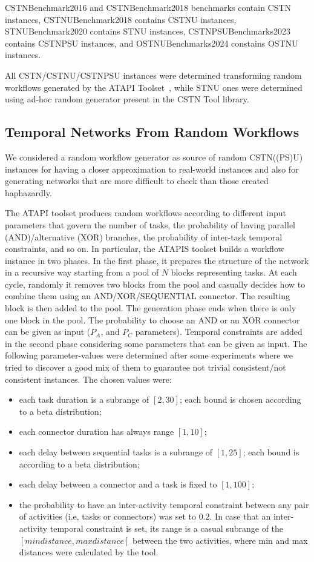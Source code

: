 \documentclass[a4paper,11pt]{article}
\begin{document}
CSTNBenchmark2016 and CSTNBenchmark2018 benchmarks contain CSTN instances, CSTNUBenchmark2018 contains CSTNU instances, STNUBenchmark2020 contains STNU instances, CSTNPSUBenchmarks2023 contains CSTNPSU instances, and OSTNUBenchmarks2024 constains 
OSTNU instances.

All CSTN/CSTNU/CSTNPSU instances were determined transforming random workflows generated by the ATAPI Toolset~\cite{LanzR14}, while STNU ones were determined using ad-hoc random generator present in the CSTN Tool library.


\subsection{Temporal Networks From Random Workflows}
We considered a random workflow generator as source of random CSTN((PS)U) instances for having a closer approximation to real-world instances and also for generating networks that are more difficult to check than those created haphazardly.

The ATAPI toolset produces random workflows according to different input parameters that govern the number of tasks, the probability of having parallel (AND)\slash alternative (XOR) branches, the probability of inter-task temporal constraints, and so on.
In particular, the ATAPIS toolset builds a workflow instance in two phases. In the first phase, it prepares the structure of the network in a recursive way starting from a pool of $N$ blocks representing tasks.
At each cycle, randomly it removes two blocks from the pool and casually decides how to combine them using an AND/XOR/SEQUENTIAL connector.
The resulting block is then added to the pool. The generation phase ends when there is only one block in the pool.
The probability to choose an AND or an XOR connector can be given as input ($P_A$, and $P_C$ parameters).
Temporal constraints are added in the second phase considering some parameters that can be given as input.
The following parameter-values were determined after some experiments where we tried to discover a good mix of them to  guarantee not trivial consistent\slash not consistent instances.
The chosen values were:
\begin{itemize}
\item each task duration is a subrange of $[2, 30]$; each bound is chosen according to a beta distribution;
\item each connector duration has always range $[1, 10]$;
\item each delay between sequential tasks is a subrange of $[1, 25]$; each bound is according to a beta distribution;
\item each delay between a connector and a task is fixed to $[1, 100]$;
\item the probability to have an inter-activity temporal constraint between any pair of activities (i.e, tasks or connectors) was set to $0.2$.
	In case that an inter-activity temporal constraint is set, its range is a casual subrange of the $[min distance, max distance]$ between the two activities, where min and max distances were calculated by the tool.
\end{itemize}
\end{document}
